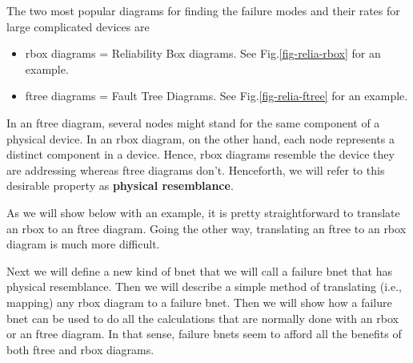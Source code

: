 The two 
most popular diagrams
for finding the failure modes and their rates
for large complicated devices
are
\begin{itemize}
\item
rbox diagrams = Reliability Box diagrams. 
See Fig.\ref{fig-relia-rbox} for an example.
\item
ftree diagrams = Fault Tree Diagrams.
See Fig.\ref{fig-relia-ftree} for an example.
\end{itemize}
In an ftree diagram,
several nodes might
stand for the same 
component of a physical device.
In an rbox diagram,
on the
other hand, 
each node
represents a distinct  component
in a device. Hence, rbox diagrams
resemble the device they are
addressing
whereas ftree diagrams don't.
Henceforth, we will
refer to this desirable property
as {\bf  physical resemblance}.

As we will
show below with an example,
it is pretty
straightforward
to translate
an rbox to  an ftree diagram.
Going the other
way, translating
an ftree to an rbox diagram
is much more difficult.



Next we will define
a new kind of bnet
that we will call a failure bnet
that has physical resemblance.
Then we will describe
a simple method of translating (i.e., mapping)
any rbox diagram to a failure bnet.
Then we will show
how a failure
bnet can be used
to do all the
calculations
that are normally
done with an rbox
or an ftree diagram.
In that sense,
failure bnets
seem to afford
all the benefits
of both ftree and rbox 
diagrams.


